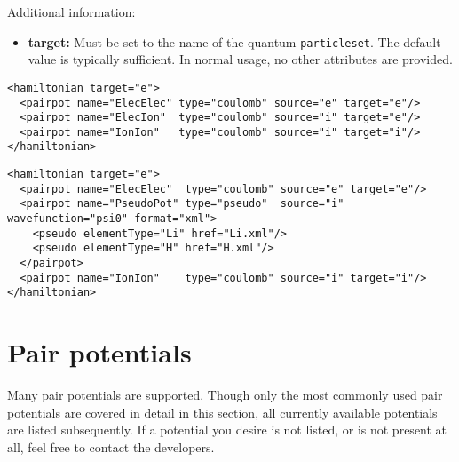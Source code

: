 Additional information:
\begin{itemize}
  \item{\textbf{target:} Must be set to the name of the quantum \texttt{particleset}.  The default value is typically sufficient.  In normal usage, no other attributes are provided.}
\end{itemize}

\begin{lstlisting}[style=QMCPXML,caption=All electron Hamiltonian XML element.]
<hamiltonian target="e">
  <pairpot name="ElecElec" type="coulomb" source="e" target="e"/>
  <pairpot name="ElecIon"  type="coulomb" source="i" target="e"/>
  <pairpot name="IonIon"   type="coulomb" source="i" target="i"/>
</hamiltonian>
\end{lstlisting}


\begin{lstlisting}[style=QMCPXML,caption=Pseudopotential Hamiltonian XML element.]
<hamiltonian target="e">
  <pairpot name="ElecElec"  type="coulomb" source="e" target="e"/>
  <pairpot name="PseudoPot" type="pseudo"  source="i" wavefunction="psi0" format="xml">
    <pseudo elementType="Li" href="Li.xml"/>
    <pseudo elementType="H" href="H.xml"/>
  </pairpot>
  <pairpot name="IonIon"    type="coulomb" source="i" target="i"/>
</hamiltonian>
\end{lstlisting}


\section{Pair potentials}

Many pair potentials are supported.  Though only the most commonly used pair potentials are covered in detail in this section, all currently available potentials are listed subsequently.  If a potential you desire is not listed, or is not present at all, feel free to contact the developers.


